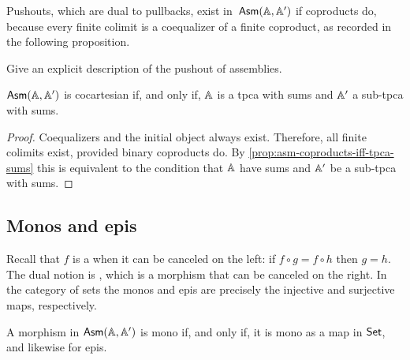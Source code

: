 Pushouts, which are dual to pullbacks, exist in~$\AsmA$ if coproducts
do, because every finite colimit is a coequalizer of a finite
coproduct, as recorded in the following proposition.

\begin{exercise}
  Give an explicit description of the pushout of assemblies.
\end{exercise}


\begin{proposition}
  \label{prop:asm-cocartesian}%
  $\AsmA$ is cocartesian if, and
  only if, $\AA$ is a tpca with sums and $\subAA$ a sub-tpca with
  sums.
\end{proposition}

\begin{proof}
  Coequalizers and the initial object always exist. Therefore, all
  finite colimits exist, provided binary coproducts do. By
  \cref{prop:asm-coproducts-iff-tpca-sums} this is
  equivalent to the condition that $\AA$ have sums and $\subAA$ be a
  sub-tpca with sums.
\end{proof}


\subsection{Monos and epis}
\label{sec:monos-epis}

Recall that $f$ is a  when it can be
canceled on the left: if $f \circ g = f \circ h$ then $g = h$. The
dual notion is , which is a morphism that can
be canceled on the right. In the category of sets the monos and epis
are precisely the injective and surjective maps, respectively.

\begin{proposition}
  \label{prop:asm-mono-epi-when}%
  A morphism in $\AsmA$ is mono if, and only if, it is mono as a map
  in $\Set$, and likewise for epis.
\end{proposition}

